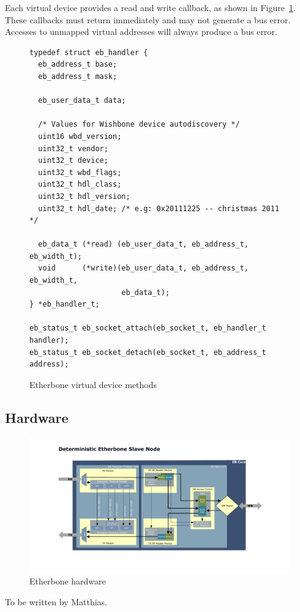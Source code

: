 \documentclass{article}
\begin{document}
Each virtual device provides a read and write callback,
as shown in Figure~\ref{fig:vdevm}.
These callbacks must return immediately and may not generate a bus error.
Accesses to unmapped virtual addresses will always produce a bus error.

\begin{figure}
\centering
\begin{lstlisting}
typedef struct eb_handler {
  eb_address_t base;
  eb_address_t mask;
  
  eb_user_data_t data;

  /* Values for Wishbone device autodiscovery */
  uint16 wbd_version;
  uint32_t vendor;
  uint32_t device;
  uint32_t wbd_flags;
  uint32_t hdl_class;
  uint32_t hdl_version;
  uint32_t hdl_date; /* e.g: 0x20111225 -- christmas 2011 */

  eb_data_t (*read) (eb_user_data_t, eb_address_t, eb_width_t);
  void      (*write)(eb_user_data_t, eb_address_t, eb_width_t, 
                     eb_data_t);
} *eb_handler_t;

eb_status_t eb_socket_attach(eb_socket_t, eb_handler_t handler); 
eb_status_t eb_socket_detach(eb_socket_t, eb_address_t address);
\end{lstlisting}
\caption{Etherbone virtual device methods}
\label{fig:vdevm}
\end{figure}


\subsection{Hardware}

\begin{figure}[t]
\centering%
\includegraphics[width=\columnwidth]{etherbone_internals}
\caption{Etherbone hardware}
\label{fig:hw-impl}
\end{figure}

To be written by Matthias.
\end{document}
